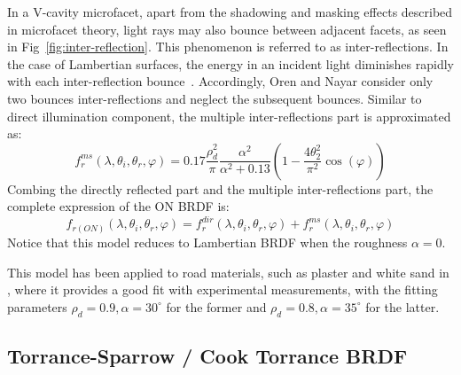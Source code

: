 In a V-cavity microfacet, apart from the shadowing and masking effects described in microfacet theory, light rays may also bounce between adjacent facets, as seen in Fig~\ref{fig:inter-reflection}.
This phenomenon is referred to as inter-reflections.
In the case of Lambertian surfaces, the energy in an incident light diminishes rapidly with each inter-reflection bounce~\cite{1995_Oren}.
Accordingly, Oren and Nayar consider only two bounces inter-reflections and neglect the subsequent bounces.
Similar to direct illumination component, the multiple inter-reflections part is approximated as:
\[
    f^{ms}_{r}(\lambda, \theta_i, \theta_r, \varphi) = 0.17 \frac{\rho_d^2}{\pi} \frac{\alpha^2}{\alpha^2 + 0.13} \left(1 - \frac{4\theta^2_2}{\pi^2} \cos(\varphi)\right)
\]
Combing the directly reflected part and the multiple inter-reflections part, the complete expression of the ON BRDF is:
\begin{equation}
    \label{eq_brdf_ON}
    f_{r(ON)}(\lambda, \theta_i, \theta_r, \varphi)   = f^{dir}_{r}(\lambda, \theta_i, \theta_r, \varphi) + f^{ms}_{r}(\lambda, \theta_i, \theta_r, \varphi)
\end{equation}
Notice that this model reduces to Lambertian BRDF when the roughness $\alpha=0$.

This model has been applied to road materials, such as plaster and white sand in \cite{1995_Oren}, where it provides a good fit with experimental measurements, with the fitting parameters $\rho_d = 0.9, \alpha = 30^\circ$ for the former and $\rho_d = 0.8, \alpha = 35^\circ$ for the latter.

\subsection{Torrance-Sparrow / Cook Torrance BRDF}
\label{subsec:brdf-cook-torrance}

